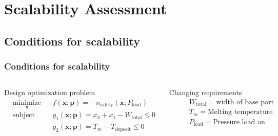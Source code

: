 \section{Scalability Assessment}
\subsection{Conditions for scalability}
\begin{frame}[t]
\frametitle{Conditions for scalability}
%
\vspace{-0.5em}
\begin{columns}[t] %
		\vspace{-1em}
		\begin{alertblock}{Design optimization problem}
			\vspace{-1.5em}
			\begin{equation*}
				\begin{aligned}
					& \underset{\mathbf{x}}{\text{minimize}}
					& & {f}(\mathbf{x};\mathbf{p}) = -n_{\textrm{safety}}(\mathbf{x};{P_{\textrm{load}}})\\
					& \text{subject to}
					& & {g_1}(\mathbf{x};\mathbf{p}) = x_3 + x_1 - {W_{\textrm{total}}} \le 0\\
					&&& {g_2}(\mathbf{x};\mathbf{p}) = {T_m} - T_{\textrm{deposit}} \le 0\\
				\end{aligned}
			\end{equation*}
		\end{alertblock}
		\vspace{-1em}
		\begin{exampleblock}{Changing requirements}
			\vspace{-1.5em}
			\begin{equation*}
				\begin{aligned}
					& & & W_{\textrm{total}} = \textrm{width of base part}\\
					& & & T_{m} = \textrm{Melting temperature of deposit}\\
					& & & P_{\textrm{load}} = \textrm{Pressure load on outer casing}\\
				\end{aligned}
			\end{equation*}
		\end{exampleblock}
		

\end{columns}
\end{frame}
